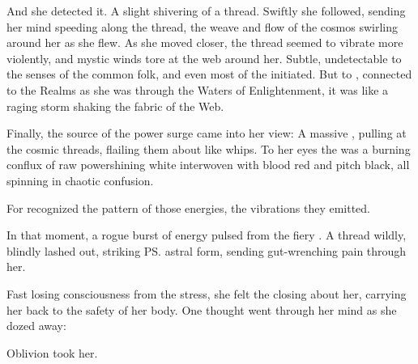 And she detected it. A slight shivering of a thread. 
Swiftly she followed, sending her mind speeding along the thread, the weave and flow of the cosmos swirling around her as she flew. 
As she moved closer, the thread seemed to vibrate more violently, and mystic winds tore at the web around her. Subtle, undetectable to the senses of the common folk, and even most of the initiated. But to \Esmerel, connected to the Realms as she was through the Waters of Enlightenment, it was like a raging storm shaking the fabric of the Web. 

Finally, the source of the power surge came into her view: A massive \vertex{}, pulling at the cosmic threads, flailing them about like whips. To her eyes the \vertex{} was a burning conflux of raw power\dash shining white interwoven with blood red and pitch black, all spinning in chaotic confusion. 

For \Esmerel{} recognized the pattern of those energies, the vibrations they emitted. 


In that moment, a rogue burst of energy pulsed from the fiery \vertex. 
A thread wildly, blindly lashed out, striking \ps{\Esmerel} astral form, sending gut-wrenching pain through her.

Fast losing consciousness from the stress, she felt the \sephiroth{} closing about her, carrying her back to the safety of her body. 
One thought went through her mind as she dozed away: 


Oblivion took her. 



